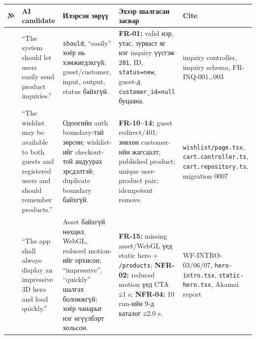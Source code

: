 \documentclass[
  mongolian,
]{article}
\begin{document}
\begin{longtable}[]{@{}
  >{\raggedleft\arraybackslash}p{}
  >{\raggedright\arraybackslash}p{}
  >{\raggedright\arraybackslash}p{}
  >{\raggedright\arraybackslash}p{}
  >{\raggedright\arraybackslash}p{}@{}}
\toprule\noalign{}
\begin{minipage}[b]{\linewidth}\raggedleft
№
\end{minipage} & \begin{minipage}[b]{\linewidth}\raggedright
AI candidate
\end{minipage} & \begin{minipage}[b]{\linewidth}\raggedright
Илэрсэн зөрүү
\end{minipage} & \begin{minipage}[b]{\linewidth}\raggedright
Эхээр шалгасан засвар
\end{minipage} & \begin{minipage}[b]{\linewidth}\raggedright
Cite
\end{minipage} \\
\midrule\noalign{}
\endhead
\bottomrule\noalign{}
\endlastfoot
1 & ``The system should let users easily send product inquiries.'' &
\texttt{should}, ``easily'' хоёр нь хэмжигдэхгүй; guest/customer, input,
output, status байхгүй. & \textbf{FR-01:} valid нэр, утас, зурваст яг
нэг inquiry үүсгэж \texttt{201}, ID, \texttt{status=new}, guest-д
\texttt{customer\_id=null} буцаана. & inquiry controller, inquiry
schema, FR-INQ-001\ldots003 \\
2 & ``The wishlist may be available to both guests and registered users
and should remember products.'' & Одоогийн auth boundary-тай зөрсөн;
wishlist-ийг checkout-той андуурах эрсдэлтэй; duplicate boundary
байхгүй. & \textbf{FR-10--14:} guest redirect/401; зөвхөн customer-ийн
жагсаалт; published product; unique user-product pair; idempotent
remove. & \texttt{wishlist/page.tsx}, \texttt{cart.controller.ts},
\texttt{cart.repository.ts}, migration 0007 \\
3 & ``The app shall always display an impressive 3D hero and load
quickly.'' & Asset байхгүй нөхцөл, WebGL, reduced motion-ийг орхисон;
``impressive'', ``quickly'' шалгах боломжгүй; хоёр чанарыг нэг өгүүлбэрт
хольсон. & \textbf{FR-15:} missing asset/WebGL үед static hero +
\texttt{/products}; \textbf{NFR-02:} reduced motion үед CTA ≤1 s;
\textbf{NFR-04:} 10 run-ийн 9-д каталог ≤2.0 s. & WF-INTRO-03/06/07,
\texttt{hero-intro.tsx}, \texttt{static-hero.tsx}, Akamai report \\
\end{longtable}
\end{document}
